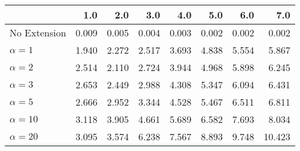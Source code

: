 \begin{tabular}{lrrrrrrr}
\toprule
{} &   1.0 &   2.0 &   3.0 &   4.0 &   5.0 &   6.0 &    7.0 \\
\midrule
No Extension  & 0.009 & 0.005 & 0.004 & 0.003 & 0.002 & 0.002 &  0.002 \\
$\alpha = 1$  & 1.940 & 2.272 & 2.517 & 3.693 & 4.838 & 5.554 &  5.867 \\
$\alpha = 2$  & 2.514 & 2.110 & 2.724 & 3.944 & 4.968 & 5.898 &  6.245 \\
$\alpha = 3$  & 2.653 & 2.449 & 2.988 & 4.308 & 5.347 & 6.094 &  6.431 \\
$\alpha = 5$  & 2.666 & 2.952 & 3.344 & 4.528 & 5.467 & 6.511 &  6.811 \\
$\alpha = 10$ & 3.118 & 3.905 & 4.661 & 5.689 & 6.582 & 7.693 &  8.034 \\
$\alpha = 20$ & 3.095 & 3.574 & 6.238 & 7.567 & 8.893 & 9.748 & 10.423 \\
\bottomrule
\end{tabular}
